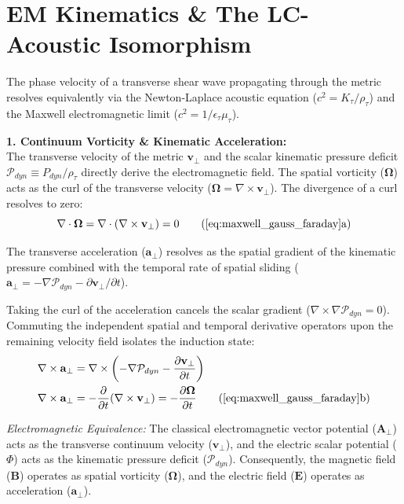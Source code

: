 \section{EM Kinematics \& The LC-Acoustic Isomorphism}
\label{sec:deriv_em_lc_isomorphism}

The phase velocity of a transverse shear wave propagating through the metric resolves equivalently via the Newton-Laplace acoustic equation ($c^2 = K_\tau/\rho_{\tau}$) and the Maxwell electromagnetic limit ($c^2 = 1/\epsilon_{\tau}\mu_{\tau}$). 

\vspace{0.2 cm}

\textbf{1. Continuum Vorticity \& Kinematic Acceleration:} \\
The transverse velocity of the metric $\mathbf{v}_{\perp}$ and the scalar kinematic pressure deficit $\mathcal{P}_{dyn} \equiv P_{dyn}/\rho_\tau$ directly derive the electromagnetic field. The spatial vorticity ($\boldsymbol{\Omega}$) acts as the curl of the transverse velocity ($\boldsymbol{\Omega} = \nabla \times \mathbf{v}_{\perp}$). The divergence of a curl resolves to zero:
\begin{equation}
    \nabla \cdot \boldsymbol{\Omega} = \nabla \cdot (\nabla \times \mathbf{v}_{\perp}) = 0 \tag{\ref{eq:maxwell_gauss_faraday}a}
\end{equation}

The transverse acceleration ($\mathbf{a}_\perp$) resolves as the spatial gradient of the kinematic pressure combined with the temporal rate of spatial sliding ($\mathbf{a}_\perp = -\nabla \mathcal{P}_{dyn} - \partial \mathbf{v}_{\perp}/\partial t$). 

Taking the curl of the acceleration cancels the scalar gradient ($\nabla \times \nabla \mathcal{P}_{dyn} = 0$). Commuting the independent spatial and temporal derivative operators upon the remaining velocity field isolates the induction state:
\begin{align}
    \nabla \times \mathbf{a}_\perp &= \nabla \times \left(-\nabla \mathcal{P}_{dyn} - \frac{\partial \mathbf{v}_{\perp}}{\partial t}\right) \nonumber \\
    \nabla \times \mathbf{a}_\perp &= -\frac{\partial}{\partial t}(\nabla \times \mathbf{v}_{\perp}) = -\frac{\partial \boldsymbol{\Omega}}{\partial t} \tag{\ref{eq:maxwell_gauss_faraday}b}
\end{align}

\textit{Electromagnetic Equivalence:} The classical electromagnetic vector potential ($\mathbf{A}_\perp$) acts as the transverse continuum velocity ($\mathbf{v}_\perp$), and the electric scalar potential ($\Phi$) acts as the kinematic pressure deficit ($\mathcal{P}_{dyn}$). Consequently, the magnetic field ($\mathbf{B}$) operates as spatial vorticity ($\boldsymbol{\Omega}$), and the electric field ($\mathbf{E}$) operates as acceleration ($\mathbf{a}_\perp$).

